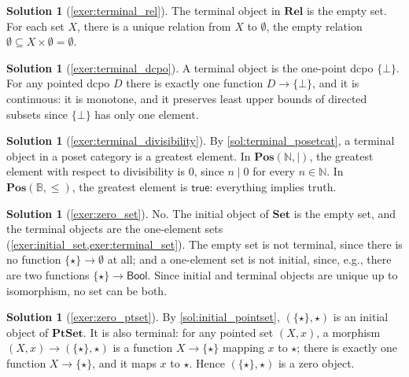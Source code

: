 \documentclass[a4paper,11pt, oneside,titlepage=false]{scrbook}
\theoremstyle{plain}
\theoremstyle{definition}
\newtheorem{solution}[thm]{Solution}
\newcommand{\Catb}[1]{\mathbf{#1}}
\newcommand{\SET}{\Catb{Set}}
\newcommand{\PTSET}{\Catb{PtSet}}
\newcommand{\POS}{\Catb{Pos}}
\newcommand{\REL}{\Catb{Rel}}
\newcommand{\NN}{\ensuremath{\mathbb{N}}}
\newcommand{\Bool}{\ensuremath{\mathsf{Bool}}}
\begin{document}
\begin{solution}[\cref{exer:terminal_rel}]\label{sol:terminal_rel}
	The terminal object in $\REL$ is the empty set. For each set $X$, there is a unique relation from $X$ to $\emptyset$, the empty relation $\emptyset \subseteq X \times \emptyset = \emptyset$.
\end{solution}

\begin{solution}[\cref{exer:terminal_dcpo}]\label{sol:terminal_dcpo}
  A terminal object is the one-point dcpo $\{\bot\}$.
  For any pointed dcpo $D$ there is exactly one function $D \to \{\bot\}$, and it
  is continuous: it is monotone, and it preserves least upper bounds of directed
  subsets since $\{\bot\}$ has only one element.
\end{solution}

\begin{solution}[\cref{exer:terminal_divisibility}]\label{sol:terminal_divisibility}
  By \cref{sol:terminal_posetcat}, a terminal object in a poset category is a
  greatest element.
  In $\POS(\NN,\mid)$, the greatest element with respect to divisibility is
  $0$, since $n \mid 0$ for every $n \in \NN$.
  In $\POS(\mathbb{B},\leq)$, the greatest element is $\mathsf{true}$:
  everything implies truth.
\end{solution}

\begin{solution}[\cref{exer:zero_set}]\label{sol:zero_set}
  No. The initial object of $\SET$ is the empty set, and the terminal objects
  are the one-element sets (\cref{exer:initial_set,exer:terminal_set}).
  The empty set is not terminal, since there is no function
  $\{\star\} \to \emptyset$ at all; and a one-element set is not initial, since,
  e.g., there are two functions $\{\star\} \to \Bool$.
  Since initial and terminal objects are unique up to isomorphism, no set can
  be both.
\end{solution}

\begin{solution}[\cref{exer:zero_ptset}]\label{sol:zero_ptset}
  By \cref{sol:initial_pointset}, $(\{\star\},\star)$ is an initial object of
  $\PTSET$.
  It is also terminal: for any pointed set $(X,x)$, a morphism
  $(X,x) \to (\{\star\},\star)$ is a function $X \to \{\star\}$ mapping $x$ to
  $\star$; there is exactly one function $X \to \{\star\}$, and it maps $x$ to
  $\star$.
  Hence $(\{\star\},\star)$ is a zero object.
\end{solution}
\end{document}
